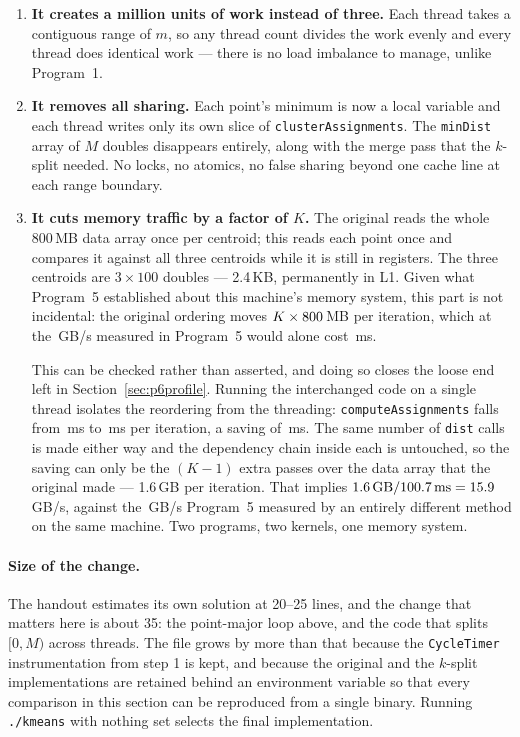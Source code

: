 \documentclass[11pt,a4paper]{article}
\newcommand{\ms}[1]{#1\,ms}
\begin{document}
\begin{enumerate}
\item \textbf{It creates a million units of work instead of three.} Each thread
takes a contiguous range of $m$, so any thread count divides the work evenly
and every thread does identical work --- there is no load imbalance to manage,
unlike Program~1.

\item \textbf{It removes all sharing.} Each point's minimum is now a local
variable and each thread writes only its own slice of
\texttt{clusterAssignments}. The \texttt{minDist} array of $M$ doubles
disappears entirely, along with the merge pass that the $k$-split needed. No
locks, no atomics, no false sharing beyond one cache line at each range
boundary.

\item \textbf{It cuts memory traffic by a factor of $K$.} The original reads
the whole 800\,MB data array once per centroid; this reads each point once and
compares it against all three centroids while it is still in registers. The
three centroids are $3 \times 100$ doubles --- 2.4\,KB, permanently in L1.
Given what Program~5 established about this machine's memory system, this part
is not incidental: the original ordering moves $K \times 800$\,MB per
iteration, which at the \prognFiveBestDram\,GB/s measured in Program~5 would
alone cost \ms{\prognSixOrigTrafficMs}.

This can be checked rather than asserted, and doing so closes the loose end
left in Section~\ref{sec:p6profile}. Running the interchanged code on a single
thread isolates the reordering from the threading:
\texttt{computeAssignments} falls from \ms{\prognSixAssignOrigIter} to
\ms{\prognSixAssignOneIter} per iteration, a saving of
\ms{\prognSixInterchangeSaved}. The same number of \texttt{dist} calls is
made either way and the dependency chain inside each is untouched, so the
saving can only be the $(K-1)$ extra passes over the data array that the
original made --- 1.6\,GB per iteration. That implies
$1.6\,\text{GB} / 100.7\,\text{ms} =
15.9$\,GB/s, against the \prognFiveBestDram\,GB/s
Program~5 measured by an entirely different method on the same machine. Two
programs, two kernels, one memory system.
\end{enumerate}

\paragraph{Size of the change.} The handout estimates its own solution at
20--25 lines, and the change that matters here is about 35: the point-major
loop above, and the code that splits $[0, M)$ across threads. The file grows by
more than that because the \texttt{CycleTimer} instrumentation from step 1 is
kept, and because the original and the $k$-split implementations are retained
behind an environment variable so that every comparison in this section can be
reproduced from a single binary. Running \texttt{./kmeans} with nothing set
selects the final implementation.
\end{document}
